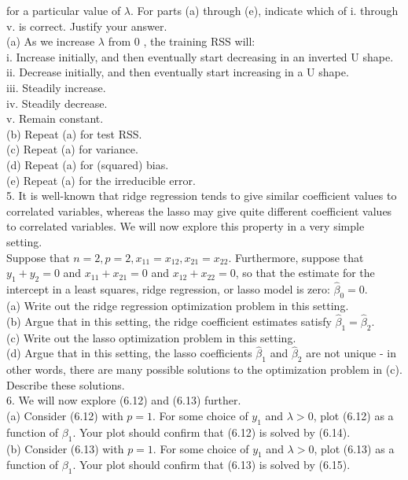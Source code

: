 \documentclass[10pt]{article}
\begin{document}
for a particular value of $\lambda$. For parts (a) through (e), indicate which of i. through v. is correct. Justify your answer.\\
(a) As we increase $\lambda$ from 0 , the training RSS will:\\
i. Increase initially, and then eventually start decreasing in an inverted U shape.\\
ii. Decrease initially, and then eventually start increasing in a U shape.\\
iii. Steadily increase.\\
iv. Steadily decrease.\\
v. Remain constant.\\
(b) Repeat (a) for test RSS.\\
(c) Repeat (a) for variance.\\
(d) Repeat (a) for (squared) bias.\\
(e) Repeat (a) for the irreducible error.\\
5. It is well-known that ridge regression tends to give similar coefficient values to correlated variables, whereas the lasso may give quite different coefficient values to correlated variables. We will now explore this property in a very simple setting.\\
Suppose that $n=2, p=2, x_{11}=x_{12}, x_{21}=x_{22}$. Furthermore, suppose that $y_{1}+y_{2}=0$ and $x_{11}+x_{21}=0$ and $x_{12}+x_{22}=0$, so that the estimate for the intercept in a least squares, ridge regression, or lasso model is zero: $\hat{\beta}_{0}=0$.\\
(a) Write out the ridge regression optimization problem in this setting.\\
(b) Argue that in this setting, the ridge coefficient estimates satisfy $\hat{\beta}_{1}=\hat{\beta}_{2}$.\\
(c) Write out the lasso optimization problem in this setting.\\
(d) Argue that in this setting, the lasso coefficients $\hat{\beta}_{1}$ and $\hat{\beta}_{2}$ are not unique - in other words, there are many possible solutions to the optimization problem in (c). Describe these solutions.\\
6. We will now explore (6.12) and (6.13) further.\\
(a) Consider (6.12) with $p=1$. For some choice of $y_{1}$ and $\lambda>0$, plot (6.12) as a function of $\beta_{1}$. Your plot should confirm that (6.12) is solved by (6.14).\\
(b) Consider (6.13) with $p=1$. For some choice of $y_{1}$ and $\lambda>0$, plot (6.13) as a function of $\beta_{1}$. Your plot should confirm that (6.13) is solved by (6.15).\\
\end{document}
